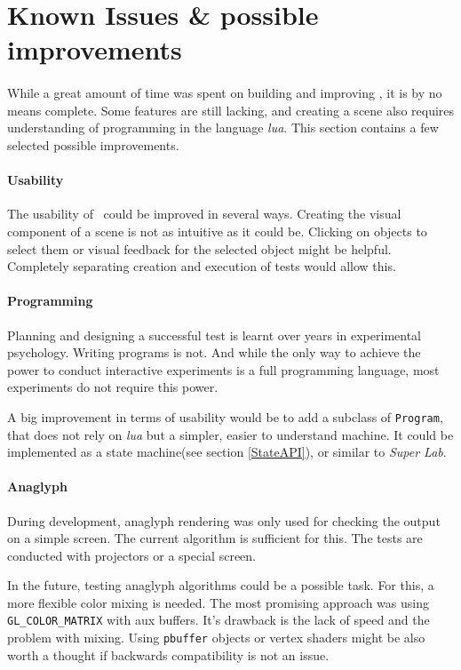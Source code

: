 \section[Issues \& improvements]{Known Issues \& possible improvements\label{Issues}}
\paragraph{}
While a great amount of time was spent on building and improving \ER, it is by no means complete.
Some features are still lacking, and creating a scene also requires understanding of programming in the language \textit{lua}.
This section contains a few selected possible improvements.

\paragraph{Usability}
The usability of \ER\ could be improved in several ways.
Creating the visual component of a scene is not as intuitive as it could be.
Clicking on objects to select them or visual feedback for the selected object might be helpful.
Completely separating creation and execution of tests would allow this.

\paragraph{Programming}
Planning and designing a successful test is learnt over years in experimental psychology.
Writing programs is not.
And while the only way to achieve the power to conduct interactive experiments is a full programming language, most experiments do not require this power.

A big improvement in terms of usability would be to add a subclass of \lstinline{Program}, that does not rely on \textit{lua} but a simpler, easier to understand machine.
It could be implemented as a state machine(see section \ref{StateAPI}), or similar to \textit{Super Lab}\cite{superlab}.

\paragraph{Anaglyph}
During development, anaglyph rendering was only used for checking the output on a simple screen.
The current algorithm is sufficient for this.
The tests are conducted with projectors or a special screen.

In the future, testing anaglyph algorithms could be a possible task.
For this, a more flexible color mixing is needed.
The most promising approach was using \lstinline{GL_COLOR_MATRIX} with aux buffers.
It's drawback is the lack of speed and the problem with mixing.
Using \lstinline{pbuffer} objects or vertex shaders might be also worth a thought if backwards compatibility is not an issue.

